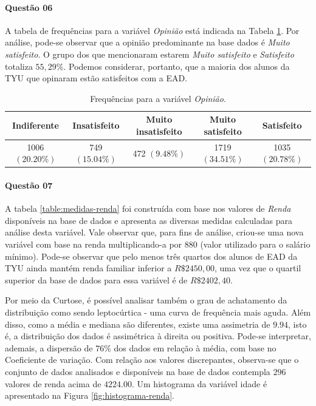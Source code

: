 \documentclass[10pt,a4paper,oneside]{article}
\begin{document}
\paragraph{Questão 06}

A tabela de frequências para a variável \textit{Opinião} está indicada na Tabela \ref{table:frequencias-opiniao}. Por análise, pode-se observar que a opinião predominante na base dados é \textit{Muito satisfeito}. O grupo dos que mencionaram estarem \textit{Muito satisfeito} e \textit{Satisfeito} totaliza $55,29\%$. Podemos considerar, portanto, que a maioria dos alunos da TYU que opinaram estão satisfeitos com a EAD.

\begin{table}[!h]
\centering
\caption{Frequências para a variável \textit{Opinião}.}
\vspace{0.5em}
\label{table:frequencias-opiniao}
\begin{tabular}{c c c c c}
	\toprule
	\textbf{Indiferente}    & \textbf{Insatisfeito}   & \textbf{Muito insatisfeito}  & \textbf{Muito satisfeito} & \textbf{Satisfeito} \\
	\midrule
	1006 $(20.20\%)$ & 749 $(15.04\%)$ & 472 $(9.48\%)$ & 1719 $(34.51\%)$ & 1035 $(20.78\%)$ \\
	\bottomrule
\end{tabular}
\end{table}


\paragraph{Questão 07}
A tabela \ref{table:medidas-renda} foi construída com base nos valores de \textit{Renda} disponíveis na base de dados e apresenta as diversas medidas calculadas para análise desta variável. Vale observar que, para fins de análise, criou-se uma nova variável com base na renda multiplicando-a por 880 (valor utilizado para o salário mínimo). Pode-se observar que pelo menos três quartos dos alunos de EAD da TYU ainda mantém renda familiar inferior a $R\$2450,00$, uma vez que o quartil superior da base de dados para essa variável é de $R\$2402,40$.

Por meio da Curtose, é possível analisar também o grau de achatamento da distribuição como sendo leptocúrtica - uma curva de frequência mais aguda. Além disso, como a média e mediana são diferentes, existe uma assimetria de $9.94$, isto é, a distribuição dos dados é assimétrica à direita ou positiva. Pode-se interpretar, ademais, a dispersão de $76\%$ dos dados em relação à média, com base no Coeficiente de variação.
Com relação aos valores discrepantes, observa-se que o conjunto de dados analisados e disponíveis na base de dados contempla $296$ valores de renda acima de $4224.00$. Um histograma da variável idade é apresentado na Figura \ref{fig:histograma-renda}.
\end{document}
